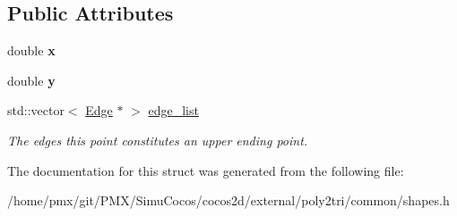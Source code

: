 \subsection*{Public Attributes}
\begin{DoxyCompactItemize}
\item 
\mbox{\label{structp2t_1_1Point_a49ca18e331005473fabe8352ae30aa87}} 
double {\bfseries x}
\item 
\mbox{\label{structp2t_1_1Point_ac145d2fc2a314ba5d1f5f93b32888313}} 
double {\bfseries y}
\item 
\mbox{\label{structp2t_1_1Point_a9c60191652a52d41d6bb09d824583aac}} 
std\+::vector$<$ \hyperlink{structp2t_1_1Edge}{Edge} $\ast$ $>$ \hyperlink{structp2t_1_1Point_a9c60191652a52d41d6bb09d824583aac}{edge\+\_\+list}
\begin{DoxyCompactList}\small\item\em The edges this point constitutes an upper ending point. \end{DoxyCompactList}\end{DoxyCompactItemize}


The documentation for this struct was generated from the following file\+:\begin{DoxyCompactItemize}
\item 
/home/pmx/git/\+P\+M\+X/\+Simu\+Cocos/cocos2d/external/poly2tri/common/shapes.\+h\end{DoxyCompactItemize}
